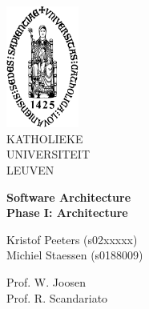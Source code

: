 \thispagestyle{empty}
\begin{flushleft}
\includegraphics[height=40mm]{figs/sedes_2.jpg}\\
\small
KATHOLIEKE\\ UNIVERSITEIT\\ LEUVEN
\end{flushleft}


\begin{center}
\textbf{Software Architecture} \\
\LARGE
\textbf{Phase I: Architecture}
\end{center}


\begin{flushleft}
\small
Kristof Peeters (s02xxxxx)\\
Michiel Staessen (s0188009)
\end{flushleft}

\begin{flushleft}
Prof. W. Joosen \\
Prof. R. Scandariato
\end{flushleft}
